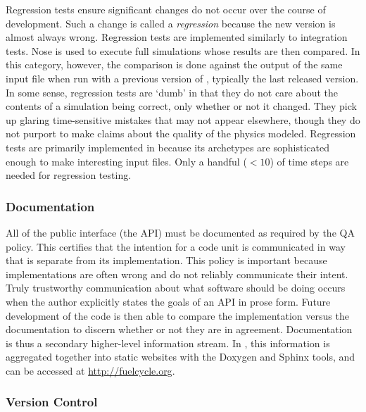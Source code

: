Regression tests ensure significant changes do not 
occur over the course of \Cyclus development. Such a change is called a 
\emph{regression} because the new version is almost always wrong.
Regression tests are implemented similarly to integration tests.
Nose is used to execute full \Cyclus simulations whose results
are then compared. In this category, however, the comparison is done against 
the output of the same input file when run with a previous version of \Cyclus, 
typically the last released version.
In some sense, regression tests are `dumb' in that they do 
not care about the contents of a simulation being correct, only whether or not 
it changed. They pick up glaring time-sensitive mistakes that may 
not appear elsewhere, though they do not purport to make claims about the
quality of the physics modeled. Regression tests are primarily implemented
in \Cycamore because its archetypes are sophisticated enough
to make interesting input files. Only a handful ($<10$) of time steps are needed 
for regression testing.

\subsubsection{Documentation}

All of the public interface (the \gls{API}) must be documented as required by the \Cyclus
\gls{QA} policy. This certifies that the intention for a code unit is communicated 
in way that is separate from its implementation. This policy is important 
because implementations are often wrong and do not reliably communicate their intent. Truly trustworthy communication about what 
software should be doing occurs when the author explicitly states the 
goals of an \gls{API} in prose form. Future development of the code is then able to 
compare the implementation versus the documentation to discern whether or not they 
are in agreement. Documentation is thus a secondary higher-level information 
stream.  In \Cyclus, this information is aggregated together into static 
websites with the Doxygen \cite{van_heesch_doxygen:_2008} and Sphinx 
\cite{brandl_sphinx_2014} 
tools, and can be accessed at \url{http://fuelcycle.org}.

\subsubsection{Version Control}

